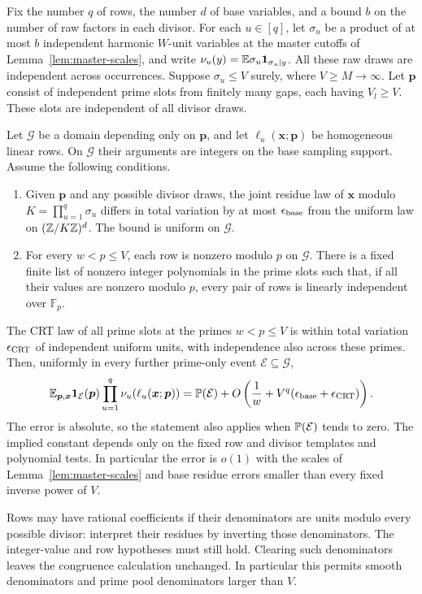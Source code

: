 \begin{proposition}\label{prop:linear-forms}
Fix the number \(q\) of rows, the number \(d\) of base variables,
and a bound \(b\) on the number of raw factors in each divisor.
For each \(u\in[q]\), let \(\sigma_u\) be a product of at most
\(b\) independent harmonic \(W\)-unit variables at the master
cutoffs of Lemma~\ref{lem:master-scales}, and write
\(\nu_u(y)=\mathbb E\sigma_u\mathbf 1_{\sigma_u\mid y}\).
All these raw draws are independent across occurrences.  Suppose
\(\sigma_u\le V\) surely, where \(V\ge M\to\infty\).
Let \(\boldsymbol p\) consist of independent prime slots from
finitely many gaps, each having \(V_l\ge V\).  These slots are
independent of all divisor draws.

Let \(\mathcal G\) be a domain depending only on
\(\boldsymbol p\), and let
\(\ell_u(\boldsymbol x;\boldsymbol p)\) be homogeneous linear
rows.  On \(\mathcal G\) their arguments are integers on the
base sampling support.  Assume the following conditions.
\begin{enumerate}
\item Given \(\boldsymbol p\) and any possible divisor draws,
the joint residue law of \(\boldsymbol x\) modulo
\(K=\prod_{u=1}^q\sigma_u\) differs in total variation by at
most \(\epsilon_{\rm base}\) from the uniform law on
\((\mathbb Z/K\mathbb Z)^d\).  The bound is uniform on \(\mathcal G\).
\item For every \(w<p\le V\), each row is nonzero modulo
\(p\) on \(\mathcal G\).  There is a fixed finite list of
nonzero integer polynomials in the prime slots such that, if all
their values are nonzero modulo \(p\), every pair of rows is
linearly independent over \(\mathbb F_p\).
\end{enumerate}
The CRT law of all prime slots at the primes \(w<p\le V\)
is within total variation \(\epsilon_{\rm CRT}\) of independent
uniform units, with independence also across these primes.
Then, uniformly in every further prime-only event
\(\mathcal E\subseteq\mathcal G\),
\begin{equation}\label{eq:restricted-linear-forms}
 \mathbb E_{\boldsymbol p,\boldsymbol x}
   \mathbf 1_{\mathcal E}(\boldsymbol p)
   \prod_{u=1}^q\nu_u(\ell_u(\boldsymbol x;\boldsymbol p))
 =\mathbb P(\mathcal E)+
 O\left(\frac1w+V^q(\epsilon_{\rm base}+
                              \epsilon_{\rm CRT})\right).
\end{equation}
The error is absolute, so the statement also applies when
\(\mathbb P(\mathcal E)\) tends to zero.
The implied constant depends only on the fixed row and divisor
templates and polynomial tests.  In particular the error is \(o(1)\)
with the scales of Lemma~\ref{lem:master-scales} and base residue
errors smaller than every fixed inverse power of \(V\).

Rows may have rational coefficients if their denominators are units
modulo every possible divisor: interpret their residues by inverting
those denominators.  The integer-value and row hypotheses must still
hold.  Clearing such denominators leaves the congruence calculation
unchanged.  In particular this permits smooth denominators and prime
pool denominators larger than \(V\).
\end{proposition}

